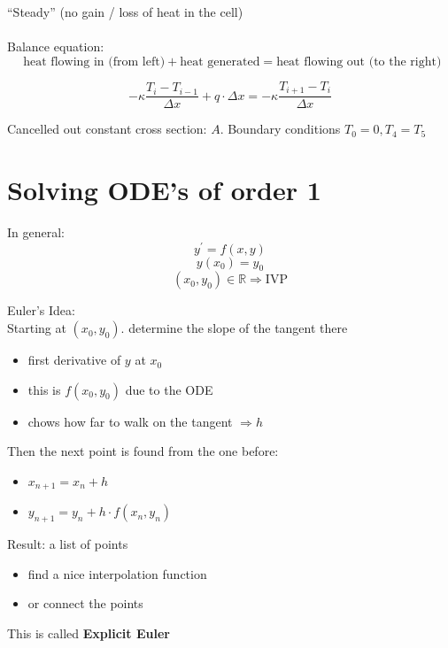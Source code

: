 \documentclass[a4paper,12pt]{report}
\newcommand{\R}{\mathbb{R}}
\begin{document}
	``Steady'' (no gain / loss of heat in the cell)\\ \\
	Balance equation:
	$$\text{ heat flowing in (from left)} +\text{heat generated} = \text{heat flowing out (to the right)}$$
	
	$$ -\kappa \frac{T_i - T_{i-1}}{\Delta x} + q \cdot \Delta x = -\kappa \frac{ T_{i+1}-T_i }{ \Delta x } $$
	
	Cancelled out constant cross section: $A$.  Boundary conditions $T_0 = 0, T_4 = T_5$
	
	\section{Solving ODE's of order 1}
	In general:
	$$ y^\prime = f(x,y)$$
	$$ y(x_0) = y_0 $$
	$$ (x_0, y_0)  \in \R \Rightarrow \text{IVP}$$
	
	\noindent Euler's Idea:\\
	Starting at $(x_0, y_0)$. determine the slope of the tangent there\\
	\begin{itemize}
	\item first derivative of $y$ at $x_0$
	\item this is $f(x_0, y_0)$ due to the ODE
	\item chows how far to walk on the tangent $\Rightarrow h$
	\end{itemize}
	Then the next point is found from the one before:
		\begin{itemize}
		\item $ x_{n+1} = x_n + h $
		\item $ y_{n+1} = y_n + h \cdot f(x_n, y_n) $
		\end{itemize}
	Result:  a list of points
	\begin{itemize}
	\item find a nice interpolation function
	\item or connect the points
	\end{itemize}
	
	This is called \textbf{Explicit Euler}

	
	
\end{document}
